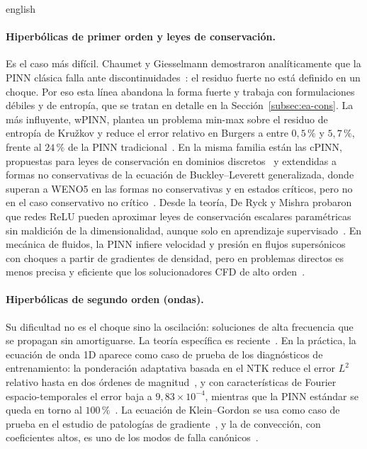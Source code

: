 \documentclass[../0000.tex]{subfiles}
\begin{document}
\begin{hyphenrules}{english}
\paragraph{Hiperbólicas de primer orden y leyes de conservación.} Es el caso más difícil. Chaumet y Giesselmann demostraron analíticamente que la PINN clásica falla ante discontinuidades~\cite{chaumet2024improving}: el residuo fuerte no está definido en un choque. Por eso esta línea abandona la forma fuerte y trabaja con formulaciones débiles y de entropía, que se tratan en detalle en la Sección~\ref{subsec:ea-cons}. La más influyente, wPINN, plantea un problema min-max sobre el residuo de entropía de Kružkov y reduce el error relativo en Burgers a entre $0{,}5\,\%$ y $5{,}7\,\%$, frente al $24\,\%$ de la PINN tradicional~\cite{de2024wpinns}. En la misma familia están las cPINN, propuestas para leyes de conservación en dominios discretos~\cite{jagtap2020conservative} y extendidas a formas no conservativas de la ecuación de Buckley--Leverett generalizada, donde superan a WENO5 en las formas no conservativas y en estados críticos, pero no en el caso conservativo no crítico~\cite{quita2023conservative}. Desde la teoría, De Ryck y Mishra probaron que redes ReLU pueden aproximar leyes de conservación escalares paramétricas sin maldición de la dimensionalidad, aunque solo en aprendizaje supervisado~\cite{de2024error}. En mecánica de fluidos, la PINN infiere velocidad y presión en flujos supersónicos con choques a partir de gradientes de densidad, pero en problemas directos es menos precisa y eficiente que los solucionadores CFD de alto orden~\cite{cai2021physics}.

\paragraph{Hiperbólicas de segundo orden (ondas).} Su dificultad no es el choque sino la oscilación: soluciones de alta frecuencia que se propagan sin amortiguarse. La teoría específica es reciente~\cite{qian2023error}. En la práctica, la ecuación de onda 1D aparece como caso de prueba de los diagnósticos de entrenamiento: la ponderación adaptativa basada en el NTK reduce el error $L^2$ relativo hasta en dos órdenes de magnitud~\cite{wang2022and}, y con características de Fourier espacio-temporales el error baja a $9{,}83\times10^{-4}$, mientras que la PINN estándar se queda en torno al $100\,\%$~\cite{wang2021eigenvector}. La ecuación de Klein--Gordon se usa como caso de prueba en el estudio de patologías de gradiente~\cite{wang2021understanding}, y la de convección, con coeficientes altos, es uno de los modos de falla canónicos~\cite{krishnapriyan2021characterizing,rathore2024challenges}.


\end{hyphenrules}
\end{document}
